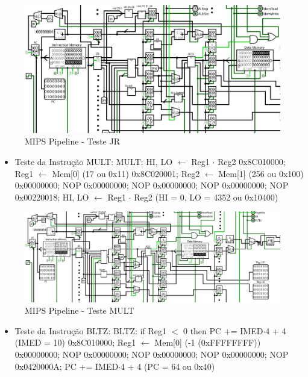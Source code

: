 \documentclass{report}
\begin{document}
        \begin{figure}[h!]
            \centering
            \includegraphics[width=\linewidth]{images/prints/Pipeline/Teste JR.png}
            \caption{\label{print:pipeline_test_JR} MIPS Pipeline - Teste JR}
        \end{figure}

        \begin{itemize}
            \item Teste da Instrução MULT:
                \subitem MULT: HI, LO $\leftarrow$ Reg1 $\cdot$ Reg2
                \subitem 0x8C010000; Reg1 $\leftarrow$ Mem[0] (17 ou 0x11)
                \subitem 0x8C020001; Reg2 $\leftarrow$ Mem[1] (256 ou 0x100)
                \subitem 0x00000000; NOP
                \subitem 0x00000000; NOP
                \subitem 0x00000000; NOP
                \subitem 0x00000000; NOP
                \subitem 0x00220018; HI, LO $\leftarrow$ Reg1 $\cdot$ Reg2 (HI = 0, LO = 4352 ou 0x10400)
        \end{itemize}
        
        \begin{figure}[h!]
            \centering
            \includegraphics[width=\linewidth]{images/prints/Pipeline/Teste MULT.png}
            \caption{\label{print:pipeline_test_MULT} MIPS Pipeline - Teste MULT}
        \end{figure}

        \clearpage
        \begin{itemize}
            \item Teste da Instrução BLTZ:
                \subitem BLTZ: if Reg1 $<$ 0 then PC += IMED$\cdot$4 + 4 (IMED = 10)
                \subitem 0x8C010000; Reg1 $\leftarrow$ Mem[0] (-1 (0xFFFFFFFF))
                \subitem 0x00000000; NOP
                \subitem 0x00000000; NOP
                \subitem 0x00000000; NOP
                \subitem 0x00000000; NOP
                \subitem 0x0420000A; PC += IMED$\cdot$4 + 4 (PC = 64 ou 0x40)
        \end{itemize}
        
\end{document}
